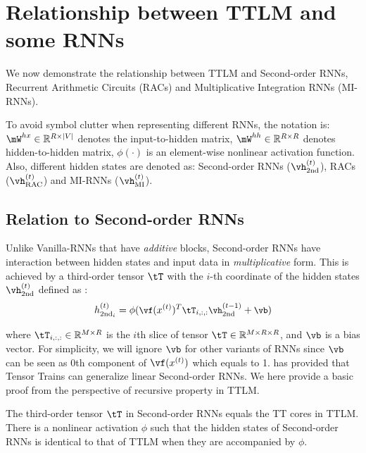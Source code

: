 \section{Relationship between TTLM and some RNNs}
\label{sec: TTLM generalization}

We now demonstrate the relationship between TTLM and Second-order RNNs,  Recurrent Arithmetic Circuits (RACs) and Multiplicative Integration RNNs (MI-RNNs).  

To avoid symbol clutter when representing  different RNNs, the notation is:  $\mW^{hx} \in \mathbb{R}^{R \times |V|}$ denotes the input-to-hidden  matrix, $\mW^{hh} \in \mathbb{R}^{R \times R}$ denotes hidden-to-hidden  matrix, $\phi(\cdot)$ is an element-wise nonlinear activation function. Also, different hidden states are denoted as: Second-order RNNs ($\vh^{(t)}_\textrm{2nd}$), RACs ($\vh^{(t)}_\textrm{RAC}$) and MI-RNNs ($\vh^{(t)}_\textrm{MI}$).


\subsection{Relation to Second-order RNNs}
\label{appendix: seecond}

Unlike Vanilla-RNNs \citep{mikolov2012context} that have \textit{additive} blocks, Second-order RNNs have interaction between hidden states and input data in \textit{multiplicative} form.   This is achieved by a third-order tensor $\tT$ with the $i$-th coordinate of the hidden states $\vh^{(t)}_\textrm{2nd}$ defined as \citep{hochreiter1997long, maupome-meurs-2020-language}:
%
\begin{equation} \small
\label{eq: second-order-rnn}
h^{(t)}_{\textrm{2nd}_i}  = \phi(\vf(x^{(t)})^T \tT_{i, :, :}\vh^{(t-1)}_\textrm{2nd} + \vb)
\end{equation}
%

where $\tT_{i, :, :} \in\mathbb{R}^{M \times R}$ is the $i$th slice of tensor $\tT\in\mathbb{R}^{M\times R \times R}$, and $\vb$ is a bias vector. For simplicity, we will ignore  $\vb$ for other variants of RNNs since $\vb$  can be seen as $0$th component of $\vf (x^{(t)})$ which equals to 1. \cite{rabusseau2019connecting} has provided that Tensor Trains can  generalize linear Second-order RNNs. We here provide a basic proof from the perspective of recursive property in TTLM.

\begin{claim}
\label{cm: G and T}
The third-order tensor $\tT$ in Second-order RNNs equals the TT cores in TTLM. There is a nonlinear activation $\phi$ such that the hidden states of Second-order RNNs is identical to that of TTLM when they are accompanied by $\phi$.
\end{claim}


